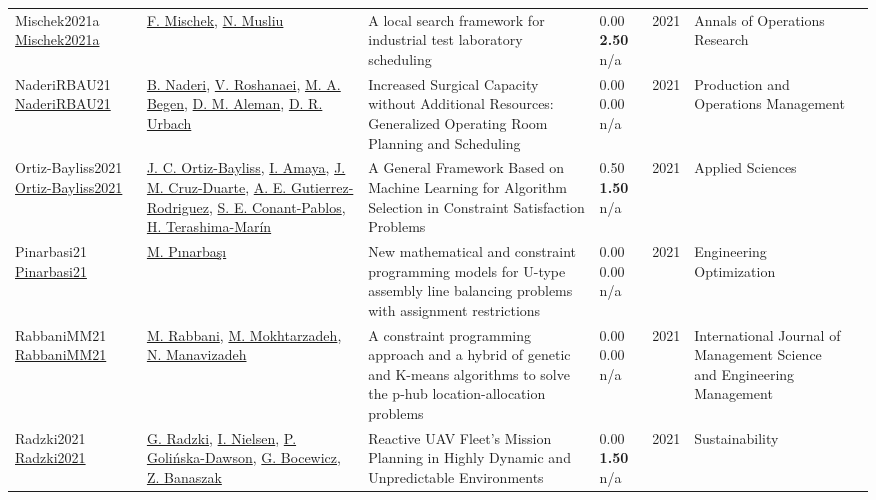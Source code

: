 {\begin{longtable}{p{3cm}p{5cm}p{10cm}p{1cm}rp{2.5cm}l}
Mischek2021a \href{http://dx.doi.org/10.1007/s10479-021-04007-1}{Mischek2021a} & \hyperref[auth:a80]{F. Mischek}, \hyperref[auth:a45]{N. Musliu} & \cellcolor{gold!20}A local search framework for industrial test laboratory scheduling & \noindent{}\textcolor{black!50}{0.00} \textbf{2.50} n/a & 2021 & Annals of Operations Research & \cite{Mischek2021a}\\
NaderiRBAU21 \href{http://dx.doi.org/10.1111/poms.13397}{NaderiRBAU21} & \hyperref[auth:a726]{B. Naderi}, \hyperref[auth:a728]{V. Roshanaei}, \hyperref[auth:a836]{M. A. Begen}, \hyperref[auth:a895]{D. M. Aleman}, \hyperref[auth:a896]{D. R. Urbach} & Increased Surgical Capacity without Additional Resources: Generalized Operating Room Planning and Scheduling & \noindent{}\textcolor{black!50}{0.00} \textcolor{black!50}{0.00} n/a & 2021 & \cellcolor{red!20}Production and Operations Management & \cite{NaderiRBAU21}\\
Ortiz-Bayliss2021 \href{http://dx.doi.org/10.3390/app11062749}{Ortiz-Bayliss2021} & \hyperref[auth:a1603]{J. C. Ortiz-Bayliss}, \hyperref[auth:a1604]{I. Amaya}, \hyperref[auth:a1605]{J. M. Cruz-Duarte}, \hyperref[auth:a1606]{A. E. Gutierrez-Rodriguez}, \hyperref[auth:a1607]{S. E. Conant-Pablos}, \hyperref[auth:a1608]{H. Terashima-Marín} & \cellcolor{gold!20}A General Framework Based on Machine Learning for Algorithm Selection in Constraint Satisfaction Problems & \noindent{}0.50 \textbf{1.50} n/a & 2021 & Applied Sciences & \cite{Ortiz-Bayliss2021}\\
Pinarbasi21 \href{http://dx.doi.org/10.1080/0305215x.2021.1921171}{Pinarbasi21} & \hyperref[auth:a1384]{M. Pınarbaşı} & New mathematical and constraint programming models for U-type assembly line balancing problems with assignment restrictions & \noindent{}\textcolor{black!50}{0.00} \textcolor{black!50}{0.00} n/a & 2021 & \cellcolor{red!20}Engineering Optimization & \cite{Pinarbasi21}\\
RabbaniMM21 \href{http://dx.doi.org/10.1080/17509653.2021.1905096}{RabbaniMM21} & \hyperref[auth:a1246]{M. Rabbani}, \hyperref[auth:a515]{M. Mokhtarzadeh}, \hyperref[auth:a1247]{N. Manavizadeh} & A constraint programming approach and a hybrid of genetic and K-means algorithms to solve the p-hub location-allocation problems & \noindent{}\textcolor{black!50}{0.00} \textcolor{black!50}{0.00} n/a & 2021 & \cellcolor{red!20}International Journal of Management Science and Engineering Management & \cite{RabbaniMM21}\\
Radzki2021 \href{http://dx.doi.org/10.3390/su13095228}{Radzki2021} & \hyperref[auth:a2007]{G. Radzki}, \hyperref[auth:a1705]{I. Nielsen}, \hyperref[auth:a2008]{P. Golińska-Dawson}, \hyperref[auth:a630]{G. Bocewicz}, \hyperref[auth:a1814]{Z. Banaszak} & \cellcolor{gold!20}Reactive UAV Fleet's Mission Planning in Highly Dynamic and Unpredictable Environments & \noindent{}\textcolor{black!50}{0.00} \textbf{1.50} n/a & 2021 & Sustainability & \cite{Radzki2021}\\

\end{longtable}}
